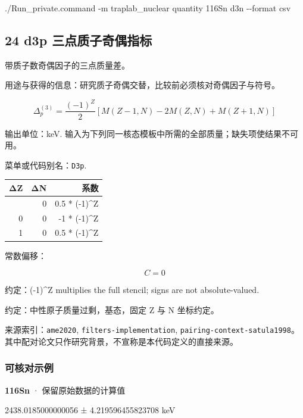 \documentclass[
  11pt,
  letterpaper,
]{article}
\newenvironment{Shaded}{}{}
\newcommand{\AttributeTok}[1]{\textcolor[rgb]{0.49,0.56,0.16}{#1}}
\newcommand{\ExtensionTok}[1]{#1}
\newcommand{\NormalTok}[1]{#1}
\begin{document}
\begin{Shaded}
\begin{Highlighting}[]
\ExtensionTok{./Run\_private.command} \AttributeTok{{-}m}\NormalTok{ traplab\_nuclear quantity 116Sn d3n }\AttributeTok{{-}{-}format}\NormalTok{ csv}
\end{Highlighting}
\end{Shaded}

\subsection{24 d3p
三点质子奇偶指标}\label{d3p-ux4e09ux70b9ux8d28ux5b50ux5947ux5076ux6307ux6807}

带质子数奇偶因子的三点质量差。

用途与获得的信息：研究质子奇偶交替，比较前必须核对奇偶因子与符号。

\[
\Delta_p^{(3)}=\frac{(-1)^Z}{2}[M(Z-1,N)-2M(Z,N)+M(Z+1,N)]
\]

输出单位：keV.
输入为下列同一核态模板中所需的全部质量；缺失项使结果不可用。

菜单或代码别名：\texttt{D3p}.

\begin{longtable}[]{@{}rrr@{}}
\toprule\noalign{}
ΔZ & ΔN & 系数 \\
\midrule\noalign{}
\endhead
\bottomrule\noalign{}
\endlastfoot
-1 & 0 & 0.5 * (-1)\^{}Z \\
0 & 0 & -1 * (-1)\^{}Z \\
1 & 0 & 0.5 * (-1)\^{}Z \\
\end{longtable}

常数偏移：

\[
C=0
\]

约定：(-1)\^{}Z multiplies the full stencil; signs are not
absolute-valued.

约定：中性原子质量过剩，基态，固定 Z 与 N 坐标约定。

来源索引：\texttt{ame2020}, \texttt{filters-implementation},
\texttt{pairing-context-satula1998}。其中配对论文只作研究背景，不宣称是本代码定义的直接来源。

\subsubsection{可核对示例}\label{ux53efux6838ux5bf9ux793aux4f8b-23}

\textbf{116Sn} · 保留原始数据的计算值

2438.0185000000056 ± 4.219596455823708 keV
\end{document}
